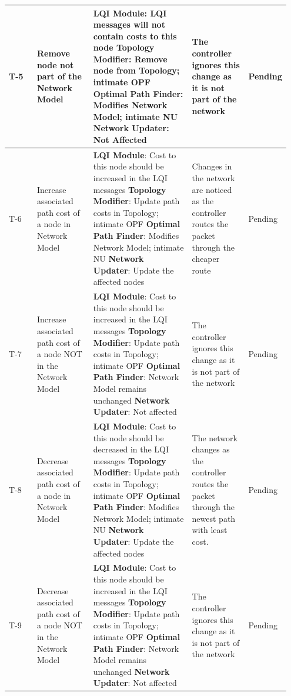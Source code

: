 \documentclass{article}
\begin{document}
{\begin{longtable}{  | p{0.1\linewidth} | p{0.2\linewidth} | p{0.35\linewidth} | p{0.2\linewidth} | p{0.1\linewidth} | }
\hline
T-5 & 
Remove node not part of the Network Model & 
\textbf{LQI Module}: LQI messages will not contain costs to this node\newline 
\textbf{Topology Modifier}: Remove node from Topology; intimate OPF\newline 
\textbf{Optimal Path Finder}: Modifies Network Model; intimate NU\newline
\textbf{Network Updater}: Not Affected &
The controller ignores this change as it is not part of the network &
Pending\\
\hline
T-6 & 
Increase associated path cost of a node in Network Model & 
\textbf{LQI Module}:  Cost to this node should be increased in the LQI messages\newline 
\textbf{Topology Modifier}: Update path costs in Topology; intimate OPF\newline 
\textbf{Optimal Path Finder}: Modifies Network Model; intimate NU\newline
\textbf{Network Updater}: Update the affected nodes &
Changes in the network are noticed as the controller routes the packet through the cheaper route &
Pending\\
\hline
T-7 & 
Increase associated path cost of a node NOT in the Network Model & 
\textbf{LQI Module}: Cost to this node should be increased in the LQI messages\newline 
\textbf{Topology Modifier}: Update path costs in Topology; intimate OPF\newline 
\textbf{Optimal Path Finder}: Network Model remains unchanged\newline
\textbf{Network Updater}: Not affected &
The controller ignores this change as it is not part of the network &
Pending\\
\hline
T-8 & 
Decrease associated path cost of a node in Network Model & 
\textbf{LQI Module}: Cost to this node should be decreased in the LQI messages\newline 
\textbf{Topology Modifier}: Update path costs in Topology; intimate OPF \newline 
\textbf{Optimal Path Finder}: Modifies Network Model; intimate NU\newline
\textbf{Network Updater}: Update the affected nodes \newline &
The network changes as the controller routes the packet through the newest path with least cost. &
Pending\\
\hline
T-9 & 
Decrease associated path cost of a node NOT in the Network Model & 
\textbf{LQI Module}: Cost to this node should be increased in the LQI messages\newline 
\textbf{Topology Modifier}: Update path costs in Topology; intimate OPF\newline 
\textbf{Optimal Path Finder}: Network Model remains unchanged\newline
\textbf{Network Updater}: Not affected &
The controller ignores this change as it is not part of the network &
Pending\\
\hline
\end{longtable}}
\end{document}
